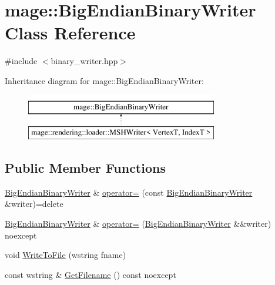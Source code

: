 \hypertarget{classmage_1_1_big_endian_binary_writer}{}\section{mage\+:\+:Big\+Endian\+Binary\+Writer Class Reference}
\label{classmage_1_1_big_endian_binary_writer}


{\ttfamily \#include $<$binary\+\_\+writer.\+hpp$>$}

Inheritance diagram for mage\+:\+:Big\+Endian\+Binary\+Writer\+:\begin{figure}[H]
\begin{center}
\leavevmode
\includegraphics[height=2.000000cm]{classmage_1_1_big_endian_binary_writer}
\end{center}
\end{figure}
\subsection*{Public Member Functions}
\begin{DoxyCompactItemize}
\item 
\hyperlink{classmage_1_1_big_endian_binary_writer}{Big\+Endian\+Binary\+Writer} \& \hyperlink{classmage_1_1_big_endian_binary_writer_ae574f7d0b630890256996c52818ba633}{operator=} (const \hyperlink{classmage_1_1_big_endian_binary_writer}{Big\+Endian\+Binary\+Writer} \&writer)=delete
\item 
\hyperlink{classmage_1_1_big_endian_binary_writer}{Big\+Endian\+Binary\+Writer} \& \hyperlink{classmage_1_1_big_endian_binary_writer_a8c01bf43f5e941578c5c5947ea184a78}{operator=} (\hyperlink{classmage_1_1_big_endian_binary_writer}{Big\+Endian\+Binary\+Writer} \&\&writer) noexcept
\item 
void \hyperlink{classmage_1_1_big_endian_binary_writer_a3a49f78f308a0827f4a99150ad49d7c1}{Write\+To\+File} (wstring fname)
\item 
const wstring \& \hyperlink{classmage_1_1_big_endian_binary_writer_a61a80be19c7b59ff5803e51401e8f646}{Get\+Filename} () const noexcept
\end{DoxyCompactItemize}
